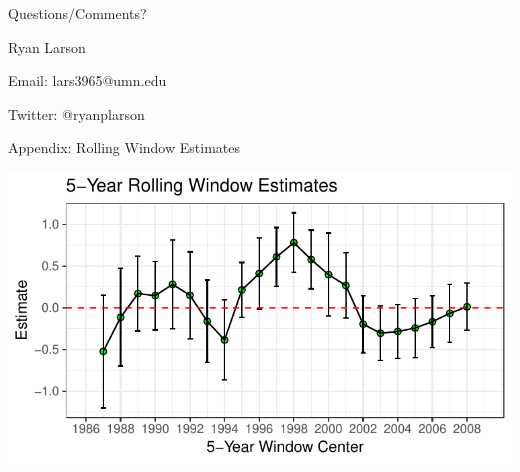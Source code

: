 \documentclass{beamer}\usepackage[]{graphicx}\usepackage[]{color}
\makeatletter
\def\maxwidth{ %
  \ifdim\Gin@nat@width>\linewidth
    \linewidth
  \else
    \Gin@nat@width
  \fi
}
\newenvironment{knitrout}{}{} %
\makeatother
\begin{document}
\begin{frame}{Questions/Comments?}

\begin{block}

\item Ryan Larson
\item Email: lars3965@umn.edu
\item Twitter: @ryanplarson

\end{block}

\end{frame}



\begin{frame}{Appendix: Rolling Window Estimates}



\begin{knitrout}
\color{fgcolor}
\includegraphics[width=\maxwidth]{figure/unnamed-chunk-13-1} 

\end{knitrout}


\end{frame}
\end{document}
